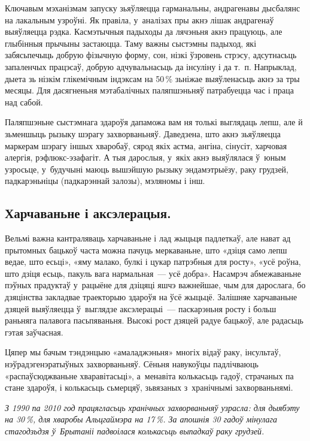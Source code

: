 Ключавым мэханізмам запуску зьяўляецца гарманальны, андрагенавы дысбалянс на лакальным узроўні. Як правіла, у~аналізах пры акнэ лішак андрагенаў выяўляецца рэдка. Касмэтычныя падыходы да лячэньня акнэ працуюць, але глыбінныя прычыны застаюцца. Таму важны сыстэмны падыход, які забясьпечыць добрую фізычную форму, сон, нізкі ўзровень стрэсу, адсутнасьць запаленчых працэсаў, добрую адчувальнасьць да інсуліну і да т.~п. Напрыклад, дыета зь нізкім глікемічным індэксам на 50\,\% зьніжае выяўленасьць акнэ за тры месяцы. Для дасягненьня мэтабалічных паляпшэньняў патрабуецца час і праца над сабой.

Паляпшэньне сыстэмнага здароўя дапаможа вам ня толькі выглядаць лепш, але й зьменшыць рызыку шэрагу захворваньняў. Даведзена, што акнэ зьяўляецца маркерам шэрагу іншых хваробаў, сярод якіх астма, ангіна, сінусіт, харчовая алергія, рэфлюкс-эзафагіт. А тыя дарослыя, у~якіх акнэ выяўлялася ў~юным узросьце, у~будучыні маюць вышэйшую рызыку эндамэтрыёзу, раку грудзей, падкарэньніцы (падкарэннай залозы), мэляномы і інш.

\subsection*{Харчаваньне і аксэлерацыя.}

Вельмі важна кантраляваць харчаваньне і лад жыцьця падлеткаў, але нават ад прытомных бацькоў часта можна пачуць меркаваньне, што «дзіця само лепш ведае, што есьці», «яму малако, булкі і цукар патрэбныя для росту», «усё роўна, што дзіця есьць, пакуль вага нармальная~--- усё добра». Насамрэч абмежаваньне пэўных прадуктаў у~рацыёне для дзіцяці яшчэ важнейшае, чым для дарослага, бо дзяцінства закладвае траекторыю здароўя на ўсё жыцьцё. Залішняе харчаваньне дзяцей выяўляецца ў~выглядзе аксэлерацыі~--- паскарэньня росту і больш раньняга палавога пасьпяваньня. Высокі рост дзяцей радуе бацькоў, але радасьць гэтая заўчасная. 


Цяпер мы бачым тэндэнцыю «амаладжэньня» многіх відаў раку, інсультаў, нэўрадэгенэратыўных захворваньняў. Сёньня навукоўцы падлічваюць «распаўсюджваньне хваравітасьці», а~менавіта колькасьць гадоў, страчаных па стане здароўя, і колькасьць сьмерцяў, зьвязаных з~хранічнымі захворваньнямі. 

\emph{З 1990 па 2010 год працягласьць хранічных захворваньняў узрасла: для дыябэту на 30\,\%, для хваробы Альцгаймэра на 17\,\%. За апошнія 30 гадоў мінулага стагодзьдзя ў~Брытаніі падвоілася колькасьць выпадкаў раку грудзей.}


